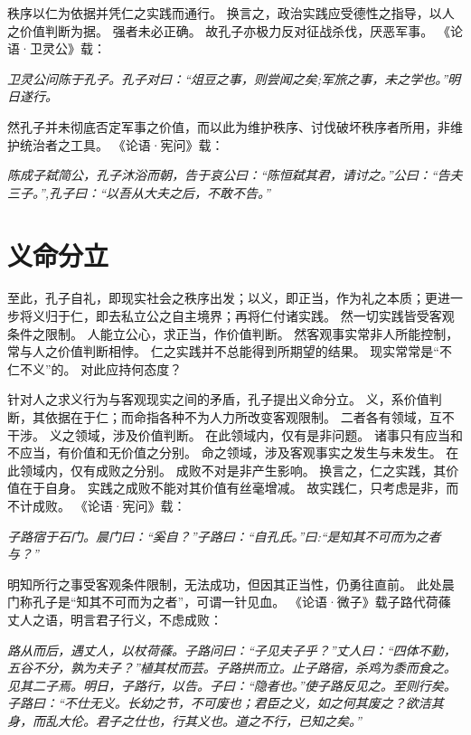 \documentclass[11pt]{article}
\begin{document}
\newline

秩序以仁为依据并凭仁之实践而通行。
换言之，政治实践应受德性之指导，以人之价值判断为据。
强者未必正确。
故孔子亦极力反对征战杀伐，厌恶军事。
《论语·卫灵公》载：

\textit{卫灵公问陈于孔子。孔子对曰：“俎豆之事，则尝闻之矣;军旅之事，未之学也。”明日遂行。}

然孔子并未彻底否定军事之价值，而以此为维护秩序、讨伐破坏秩序者所用，非维护统治者之工具。
《论语·宪问》载：

\textit{陈成子弑简公，孔子沐浴而朝，告于哀公曰：“陈恒弑其君，请讨之。”公曰：“告夫三子。”,孔子曰：“以吾从大夫之后，不敢不告。”}

\section{义命分立}
至此，孔子自礼，即现实社会之秩序出发；以义，即正当，作为礼之本质；更进一步将义归于仁，即去私立公之自主境界；再将仁付诸实践。
然一切实践皆受客观条件之限制。
人能立公心，求正当，作价值判断。
然客观事实常非人所能控制，常与人之价值判断相悖。
仁之实践并不总能得到所期望的结果。
现实常常是“不仁不义”的。
对此应持何态度？

\newline

针对人之求义行为与客观现实之间的矛盾，孔子提出义命分立。
义，系价值判断，其依据在于仁；而命指各种不为人力所改变客观限制。
二者各有领域，互不干涉。
义之领域，涉及价值判断。
在此领域内，仅有是非问题。
诸事只有应当和不应当，有价值和无价值之分别。
命之领域，涉及客观事实之发生与未发生。
在此领域内，仅有成败之分别。
成败不对是非产生影响。
换言之，仁之实践，其价值在于自身。
实践之成败不能对其价值有丝毫增减。
故实践仁，只考虑是非，而不计成败。
《论语·宪问》载：

\textit{子路宿于石门。晨门曰：“奚自？”子路曰：“自孔氏。”曰:“是知其不可而为之者与？”}

明知所行之事受客观条件限制，无法成功，但因其正当性，仍勇往直前。
此处晨门称孔子是“知其不可而为之者”，可谓一针见血。
《论语·微子》载子路代荷蓧丈人之语，明言君子行义，不虑成败：

\textit{路从而后，遇丈人，以杖荷蓧。子路问曰：“子见夫子乎？”丈人曰：“四体不勤，五谷不分，孰为夫子？”植其杖而芸。子路拱而立。止子路宿，杀鸡为黍而食之。见其二子焉。明日，子路行，以告。子曰：“隐者也。”使子路反见之。至则行矣。子路曰：“不仕无义。长幼之节，不可废也；君臣之义，如之何其废之？欲洁其身，而乱大伦。君子之仕也，行其义也。道之不行，已知之矣。”}

\newline
\end{document}
